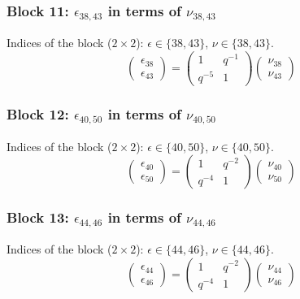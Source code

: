 \subsubsection{Block 11: $\epsilon_{38, 43}$ in terms of $\nu_{38, 43}$}
Indices of the block ($2\times 2$): $\epsilon \in \{38, 43\}$, $\nu \in \{38, 43\}$.
\[
\begin{pmatrix}
\epsilon_{38} \\
\epsilon_{43}
\end{pmatrix}
=
\begin{pmatrix}
1 & q^{-1} \\
q^{-5} & 1
\end{pmatrix}
\begin{pmatrix}
\nu_{38} \\
\nu_{43}
\end{pmatrix}
\]

\subsubsection{Block 12: $\epsilon_{40, 50}$ in terms of $\nu_{40, 50}$}
Indices of the block ($2\times 2$): $\epsilon \in \{40, 50\}$, $\nu \in \{40, 50\}$.
\[
\begin{pmatrix}
\epsilon_{40} \\
\epsilon_{50}
\end{pmatrix}
=
\begin{pmatrix}
1 & q^{-2} \\
q^{-4} & 1
\end{pmatrix}
\begin{pmatrix}
\nu_{40} \\
\nu_{50}
\end{pmatrix}
\]

\subsubsection{Block 13: $\epsilon_{44, 46}$ in terms of $\nu_{44, 46}$}
Indices of the block ($2\times 2$): $\epsilon \in \{44, 46\}$, $\nu \in \{44, 46\}$.
\[
\begin{pmatrix}
\epsilon_{44} \\
\epsilon_{46}
\end{pmatrix}
=
\begin{pmatrix}
1 & q^{-2} \\
q^{-4} & 1
\end{pmatrix}
\begin{pmatrix}
\nu_{44} \\
\nu_{46}
\end{pmatrix}
\]

